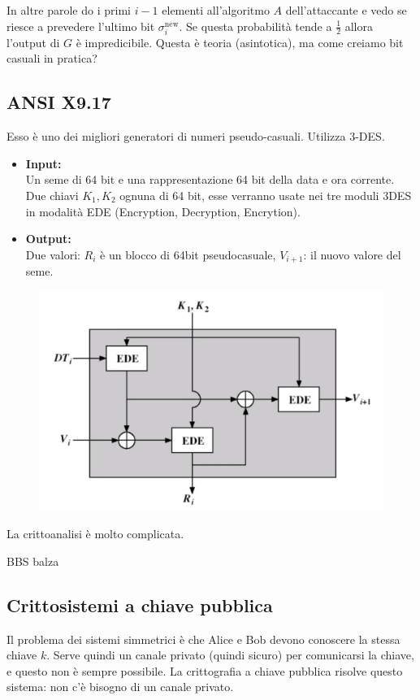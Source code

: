 In altre parole do i primi $i-1$ elementi all'algoritmo $A$ dell'attaccante e vedo se riesce a prevedere l'ultimo bit $\sigma_i^\text{new}$. Se questa probabilità tende a $\frac12$ allora l'output di $G$ è impredicibile.
Questa è teoria (asintotica), ma come creiamo bit casuali in pratica?

\newpage

\subsection*{ANSI X9.17}
Esso è uno dei migliori generatori di numeri pseudo-casuali. Utilizza 3-DES.
\begin{itemize}
	\item \textbf{Input:}\\
	Un seme di 64 bit e una rappresentazione 64 bit della data e ora corrente.\\
	Due chiavi $K_1, K_2$ ognuna di 64 bit, esse verranno usate nei tre moduli 3DES in modalità EDE (Encryption, Decryption, Encrytion).
	
	\item \textbf{Output:}\\
	Due valori: $R_i$ è un blocco di 64bit pseudocasuale, $V_{i+1}$: il nuovo valore del seme.
\end{itemize}

\begin{figure}[h]
	\includegraphics[width=0.9\linewidth]{immagini/img47}
	\centering
\end{figure}

La crittoanalisi è molto complicata.

BBS balza

\subsection*{Crittosistemi a chiave pubblica}
Il problema dei sistemi simmetrici è che Alice e Bob devono conoscere la stessa chiave $k$. Serve quindi un canale privato (quindi sicuro) per comunicarsi la chiave, e questo non è sempre possibile. La crittografia a chiave pubblica risolve questo sistema: non c'è bisogno di un canale privato.

